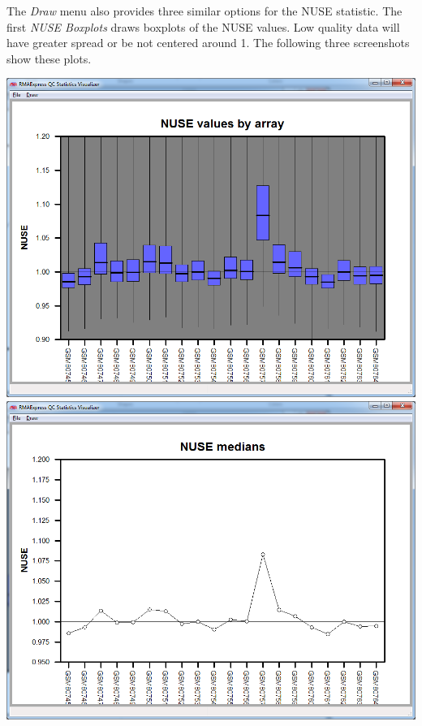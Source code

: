 \documentclass[11pt]{report}
\begin{document}
The {\it Draw} menu also provides three similar options for the NUSE statistic. The first {\it NUSE Boxplots} draws boxplots of the NUSE values. Low quality data will have greater spread or be not centered around 1. The following three screenshots show these plots.
\begin{center}
\includegraphics[scale=0.4]{NUSEBoxplot.png}\\
\includegraphics[scale=0.4]{NUSEMedians.png}\\

\end{center}
\end{document}
